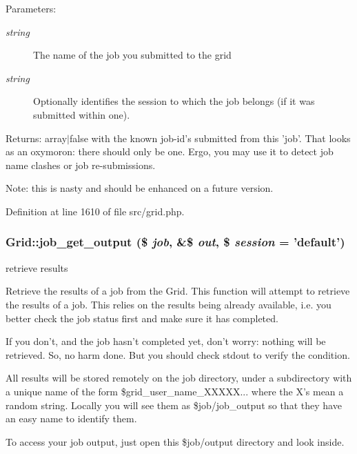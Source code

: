 \begin{Desc}
\item[Parameters:]
\begin{description}
\item[{\em string}]The name of the job you submitted to the grid \item[{\em string}]Optionally identifies the session to which the job belongs (if it was submitted within one).\end{description}
\end{Desc}
\begin{Desc}
\item[Returns:]array$|$false with the known job-id's submitted from this 'job'. That looks as an oxymoron: there should only be one. Ergo, you may use it to detect job name clashes or job re-submissions.\end{Desc}
\begin{Desc}
\item[Note:]this is nasty and should be enhanced on a future version. \end{Desc}


Definition at line 1610 of file src/grid.php.
\subsubsection{\setlength{\rightskip}{0pt plus 5cm}Grid::job\_\-get\_\-output (\$ {\em job}, \&\$ {\em out}, \$ {\em session} = 'default')}\label{classGrid_a50}


retrieve results 

Retrieve the results of a job from the Grid. This function will attempt to retrieve the results of a job. This relies on the results being already available, i.e. you better check the job status first and make sure it has completed.

If you don't, and the job hasn't completed yet, don't worry: nothing will be retrieved. So, no harm done. But you should check stdout to verify the condition.

All results will be stored remotely on the job directory, under a subdirectory with a unique name of the form \$grid\_\-user\_\-name\_\-XXXXX... where the X's mean a random string. Locally you will see them as \$job/job\_\-output so that they have an easy name to identify them.

To access your job output, just open this \$job/output directory and look inside.

